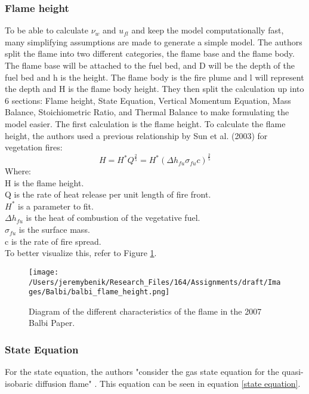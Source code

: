 \documentclass{article}
\begin{document}
\subsubsection*{Flame height}
\indent To be able to calculate $\nu _ w$ and $u_{fl}$ and keep the model computationally fast, many simplifying assumptions are made to generate a simple model. The authors split the flame into two different categories, the flame base and the flame body. The flame base will be attached to the fuel bed, and D will be the depth of the fuel bed and h is the height. The flame body is the fire plume and l will represent the depth and H is the flame body height. They then split the calculation up into 6 sections: Flame height, State Equation, Vertical Momentum Equation, Mass Balance, Stoichiometric Ratio, and Thermal Balance to make formulating the model easier. The first calculation is the flame height. To calculate the flame height, the authors used a previous relationship by Sun et al. (2003) for vegetation fires: 
\begin{equation}
	\label{Flame height}
	H = H^{*} Q^{\frac {2}{5}} = H^{*}(\Delta h_{fu} \sigma _{fu} c) ^{\frac {2}{5}}
\end{equation}
Where:\\
H is the flame height.\\
Q is the rate of heat release per unit length of fire front. \\
$H^{*}$ is a parameter to fit. \\
$\Delta h_{fu}$ is the heat of combustion of the vegetative fuel. \\
$\sigma _{fu}$ is the surface mass. \\
c is the rate of fire spread.  \\ 
To better visualize this, refer to Figure \ref{Balbi_flame_height_diagram}.
\begin{figure}[h]
\centering
  \texttt{[image: /Users/jeremybenik/Research\_Files/164/Assignments/draft/Images/Balbi/balbi\_flame\_height.png]}
  \caption{Diagram of the different characteristics of the flame in the 2007 Balbi Paper.}
  \label{Balbi_flame_height_diagram}
\end{figure}
\subsubsection*{State Equation}

For the state equation, the authors "consider the gas state equation for the quasi-isobaric diffusion flame" \citep{Balbi2007}. This equation can be seen in equation \ref{state equation}. 
\end{document}
